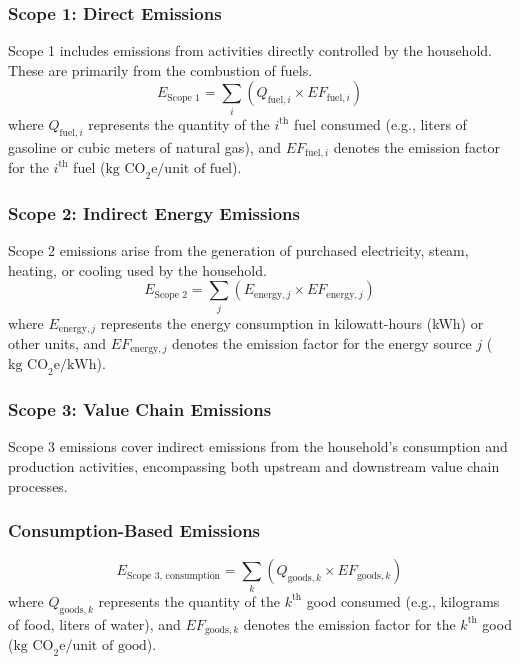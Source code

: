 \documentclass[12pt,a4paper]{article}
\begin{document}
\subsubsection*{Scope 1: Direct Emissions}
Scope 1 includes emissions from activities directly controlled by the household. These are primarily from the combustion of fuels.
\begin{equation}
E_{\text{Scope 1}} = \sum_{i} \left( Q_{\text{fuel}, i} \times EF_{\text{fuel}, i} \right)
\end{equation}
where \(Q_{\text{fuel}, i}\) represents the quantity of the \(i^{\text{th}}\) fuel consumed (e.g., liters of gasoline or cubic meters of natural gas), and \(EF_{\text{fuel}, i}\) denotes the emission factor for the \(i^{\text{th}}\) fuel (\(\text{kg CO}_2\text{e}/\text{unit of fuel}\)).


\subsubsection*{Scope 2: Indirect Energy Emissions}
Scope 2 emissions arise from the generation of purchased electricity, steam, heating, or cooling used by the household.
\begin{equation}
E_{\text{Scope 2}} = \sum_{j} \left( E_{\text{energy}, j} \times EF_{\text{energy}, j} \right)
\end{equation}
where \(E_{\text{energy}, j}\) represents the energy consumption in kilowatt-hours (kWh) or other units, and \(EF_{\text{energy}, j}\) denotes the emission factor for the energy source \(j\) (\(\text{kg CO}_2\text{e}/\text{kWh}\)).


\subsubsection*{Scope 3: Value Chain Emissions}
Scope 3 emissions cover indirect emissions from the household’s consumption and production activities, encompassing both upstream and downstream value chain processes.

\subsubsection*{Consumption-Based Emissions}
\begin{equation}
E_{\text{Scope 3, consumption}} = \sum_{k} \left( Q_{\text{goods}, k} \times EF_{\text{goods}, k} \right)
\end{equation}
where \(Q_{\text{goods}, k}\) represents the quantity of the \(k^{\text{th}}\) good consumed (e.g., kilograms of food, liters of water), and \(EF_{\text{goods}, k}\) denotes the emission factor for the \(k^{\text{th}}\) good (\(\text{kg CO}_2\text{e}/\text{unit of good}\)).
\end{document}
